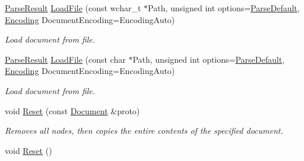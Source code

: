 \begin{DoxyCompactItemize}
\hyperlink{structMezzanine_1_1xml_1_1ParseResult}{ParseResult} \hyperlink{classMezzanine_1_1xml_1_1Document_a65c64168760182706be77eb86ae0ee4d}{LoadFile} (const wchar\_\-t $\ast$Path, unsigned int options=\hyperlink{namespaceMezzanine_1_1xml_a0eb617274d4b3cb604f3120bcdaf9850}{ParseDefault}, \hyperlink{namespaceMezzanine_1_1xml_ab1e7e96991b9c08ac13e797a15253804}{Encoding} DocumentEncoding=EncodingAuto)
\begin{DoxyCompactList}\small\item\em Load document from file. \item\end{DoxyCompactList}\item 
\hyperlink{structMezzanine_1_1xml_1_1ParseResult}{ParseResult} \hyperlink{classMezzanine_1_1xml_1_1Document_acfbe29500930edf6575b9f4eb12a7936}{LoadFile} (const char $\ast$Path, unsigned int options=\hyperlink{namespaceMezzanine_1_1xml_a0eb617274d4b3cb604f3120bcdaf9850}{ParseDefault}, \hyperlink{namespaceMezzanine_1_1xml_ab1e7e96991b9c08ac13e797a15253804}{Encoding} DocumentEncoding=EncodingAuto)
\begin{DoxyCompactList}\small\item\em Load document from file. \item\end{DoxyCompactList}\item 
void \hyperlink{classMezzanine_1_1xml_1_1Document_a937a291eb8b2df6bf43cfae2c89a762e}{Reset} (const \hyperlink{classMezzanine_1_1xml_1_1Document}{Document} \&proto)
\begin{DoxyCompactList}\small\item\em Removes all nodes, then copies the entire contents of the specified document. \item\end{DoxyCompactList}\item 
\hypertarget{classMezzanine_1_1xml_1_1Document_a4fc224fdb19ccc1ca410b4d49fc39f6c}{
void \hyperlink{classMezzanine_1_1xml_1_1Document_a4fc224fdb19ccc1ca410b4d49fc39f6c}{Reset} ()}
\label{classMezzanine_1_1xml_1_1Document_a4fc224fdb19ccc1ca410b4d49fc39f6c}


\end{DoxyCompactItemize}
